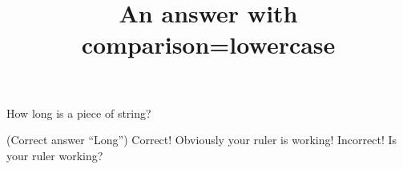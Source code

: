 \documentclass[hidesidemenu]{webquiztex}
\title{An answer with comparison=lowercase}
\begin{document}
  \begin{question}     %
     How long is a piece of string?

      (Correct answer ``Long'')
     \whenRight Correct! Obviously your ruler is working!
     \whenWrong Incorrect! Is your ruler working?
  \end{question}
\end{document}
